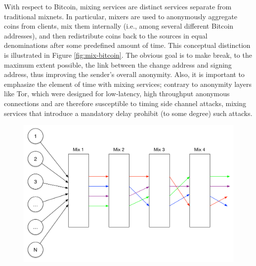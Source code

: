 With respect to Bitcoin, mixing services are distinct services separate from traditional mixnets. In particular, mixers are used to anonymously aggregate coins from clients, mix them internally (i.e., among several different Bitcoin addresses), and then redistribute coins back to the sources in equal denominations after some predefined amount of time. This conceptual distinction is illustrated in Figure \ref{fig:mix-bitcoin}. The obvious goal is to make break, to the maximum extent possible, the link between the change address and signing address, thus improving the sender's overall anonymity. Also, it is important to emphasize the element of time with mixing services; contrary to anonymity layers like Tor, which were designed for low-latency, high throughput anonymous connections and are therefore susceptible to timing side channel attacks, mixing services that introduce a mandatory delay prohibit (to some degree) such attacks.

\begin{figure}
\begin{center}
\includegraphics[scale=0.35]{images/mix_design.pdf}
\label{TODO.}
\label{fig:mix-design}
\end{center}
\end{figure}

